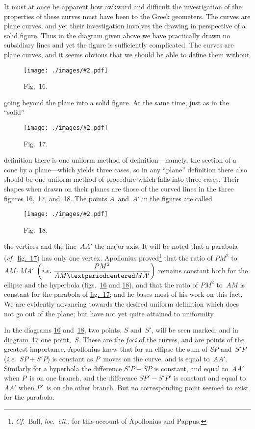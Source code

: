 \documentclass[12pt,leqno]{book}[2005/09/16]
\newcommand{\Typo}[2]{#2}
\newcommand{\Chg}[2]{#2}
\newcommand{\Graphic}[2]{%
  \phantomsection\label{fig:#2}%
  \texttt{[image: ./images/\#2.pdf]}%
}
\newcommand{\DefWidth}{4in}%
\newcommand{\Figure}[2][\DefWidth]{%
  \begin{figure}[hbt!]
    \centering
    \phantomsection\label{fig:#2}
    \Graphic{#1}{fig#2}
    \caption{Fig.~#2.}
  \end{figure}\ignorespaces%
}
\newcommand{\FigNum}[1]{\hyperref[fig:#1]{#1}}
\newcommand{\Fig}[2][Fig.]{\hyperref[fig:#2]{#1~#2}}
\newcommand{\PageSep}[1]{\ignorespaces}
\newcommand{\Cf}{\emph{Cf.}}
\newcommand{\cf}{\emph{cf.}}
\newcommand{\ie}{\emph{i.e.}}
\newcommand{\Foreign}[1]{\textit{#1}}
\begin{document}
It must at once be apparent how awkward
\PageSep{132}
and difficult the investigation of the properties
of these curves must have been to the
Greek geometers. The curves are plane
curves, and yet their investigation involves
the drawing in perspective of a solid figure.
Thus in the diagram given above we have
practically drawn no subsidiary lines and yet
the figure is sufficiently complicated. The
\PageSep{133}
curves are plane curves, and it seems obvious
that we should be able to define them without
\Figure{16}
going beyond the plane into a solid figure.
At the same time, just as in the ``solid''
\Figure[2.5in]{17}
definition there is one uniform method of
definition---namely, the section of a cone by
\PageSep{134}
a plane---which yields three cases, so in any
``plane'' definition there also should be one
uniform method of procedure which falls into
three cases. Their shapes when drawn on
their planes are those of the curved lines in
the three figures \FigNum{16},~\FigNum{17}, and~\FigNum{18}. The
points $A$~and~$A'$ in the figures are called
\Figure[4in]{18}
the vertices and the line~$AA'$ the major axis.
It will be noted that a parabola (\cf\ \Fig[fig.]{17})
%
%
has only one vertex. Apollonius proved\footnote
  {\Chg{Cf.}{\Cf}\ Ball, \Foreign{loc.\ cit.}, for this account of Apollonius and
  Pappus.}
that
the ratio of $PM^{2}$ to $AM·MA'$ $\left(\ie\ \dfrac{PM^{2}}{AM·\Typo{MA}{MA'}}\right)$
remains constant both for the ellipse and the
hyperbola (figs.\ \FigNum{16} and \FigNum{18}), and that the ratio
\PageSep{135}
of $PM^{2}$ to~$AM$ is constant for the parabola
of \Fig[fig.]{17}; and he bases most of his work
on this fact. We are evidently advancing
towards the desired uniform definition which
does not go out of the plane; but have not
yet quite attained to uniformity.

In the diagrams \FigNum{16} and~\FigNum{18}, two points, $S$
and~$S'$, will be seen marked, and in \Fig[diagram]{17}
one point,~$S$. These are the \emph{foci} of the curves,
and are points of the greatest importance.
Apollonius knew that for an ellipse the sum
of $SP$ and~$S'P$ (\ie\ $SP + S'P$) is constant as
$P$~moves on the curve, and is equal to~$AA'$.
Similarly for a hyperbola the difference $S'P - SP$
is constant, and equal to~$AA'$ when $P$~is
on one branch, and the difference $SP' - S'P'$
is constant and equal to~$AA'$ when $P'$~is on
the other branch. But no corresponding
point seemed to exist for the parabola.
\end{document}
